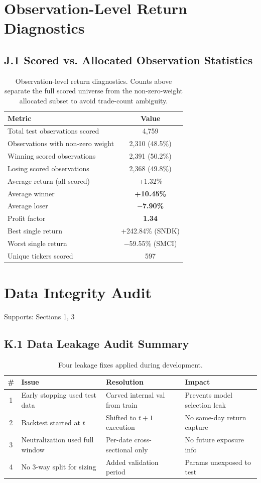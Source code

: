 \documentclass[11pt, a4paper]{article}
\begin{document}
\section{Observation-Level Return Diagnostics}
\subsection*{J.1 Scored vs. Allocated Observation Statistics}
\begin{table}[h]
\centering
\begin{tabular}{lc}
\toprule
\textbf{Metric} & \textbf{Value} \\
\midrule
Total test observations scored & 4,759 \\
Observations with non-zero weight & 2,310 (48.5\%) \\
Winning scored observations & 2,391 (50.2\%) \\
Losing scored observations & 2,368 (49.8\%) \\
Average return (all scored) & +1.32\% \\
Average winner & \textbf{+10.45\%} \\
Average loser & \textbf{$-$7.90\%} \\
Profit factor & \textbf{1.34} \\
Best single return & +242.84\% (SNDK) \\
Worst single return & $-$59.55\% (SMCI) \\
Unique tickers scored & 597 \\
\bottomrule
\end{tabular}
\caption{Observation-level return diagnostics. Counts above separate the full scored universe from the non-zero-weight allocated subset to avoid trade-count ambiguity.}
\end{table}

\section{Data Integrity Audit}
Supports: Sections 1, 3

\subsection*{K.1 Data Leakage Audit Summary}
\begin{table}[h]
\centering
\small
\begin{tabular}{cp{3.5cm}p{3.5cm}p{3.5cm}}
\toprule
\textbf{\#} & \textbf{Issue} & \textbf{Resolution} & \textbf{Impact} \\
\midrule
1 & Early stopping used test data & Carved internal val from train & Prevents model selection leak \\
2 & Backtest started at $t$ & Shifted to $t+1$ execution & No same-day return capture \\
3 & Neutralization used full window & Per-date cross-sectional only & No future exposure info \\
4 & No 3-way split for sizing & Added validation period & Params unexposed to test \\
\bottomrule
\end{tabular}
\normalsize
\caption{Four leakage fixes applied during development.}
\end{table}
\end{document}
